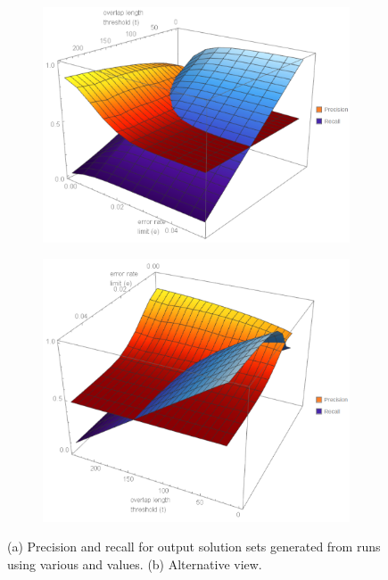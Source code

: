 \begin{figure}
\centering
   \begin{subfigure}[b]{0.8\textwidth}
   \includegraphics[width=1\linewidth]{images/phase1_A.png}
   \caption{}
\end{subfigure}

\begin{subfigure}[b]{0.8\textwidth}
   \includegraphics[width=1\linewidth]{images/phase1_B.png}
   \caption{}
\end{subfigure}

\caption[Precision and recall for output solution sets generated from runs using various  and  values.]{(a) Precision and recall for output solution sets generated from runs using various  and  values. (b) Alternative view.}
\label{fig:phase1_plots}
\end{figure}
